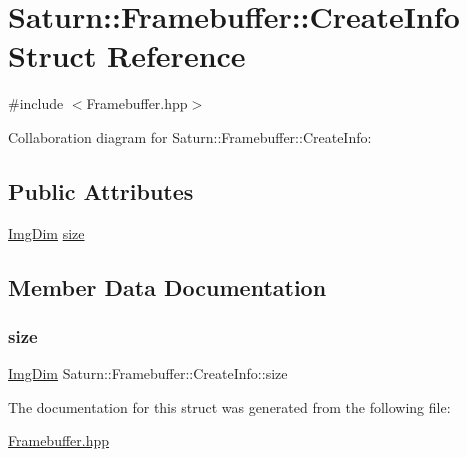 \hypertarget{struct_saturn_1_1_framebuffer_1_1_create_info}{}\section{Saturn\+:\+:Framebuffer\+:\+:Create\+Info Struct Reference}
\label{struct_saturn_1_1_framebuffer_1_1_create_info}


{\ttfamily \#include $<$Framebuffer.\+hpp$>$}



Collaboration diagram for Saturn\+:\+:Framebuffer\+:\+:Create\+Info\+:
\subsection*{Public Attributes}
\begin{DoxyCompactItemize}
\item 
\mbox{\hyperlink{namespace_saturn_a8bd2b855a967447c8314c235470e0987}{Img\+Dim}} \mbox{\hyperlink{struct_saturn_1_1_framebuffer_1_1_create_info_a0c353e6ab790a023d0b152c108ee9cbb}{size}}
\end{DoxyCompactItemize}


\subsection{Member Data Documentation}
\mbox{\label{struct_saturn_1_1_framebuffer_1_1_create_info_a0c353e6ab790a023d0b152c108ee9cbb}} 
\subsubsection{\texorpdfstring{size}{size}}
{\footnotesize\ttfamily \mbox{\hyperlink{namespace_saturn_a8bd2b855a967447c8314c235470e0987}{Img\+Dim}} Saturn\+::\+Framebuffer\+::\+Create\+Info\+::size}



The documentation for this struct was generated from the following file\+:\begin{DoxyCompactItemize}
\item 
\mbox{\hyperlink{_framebuffer_8hpp}{Framebuffer.\+hpp}}\end{DoxyCompactItemize}
